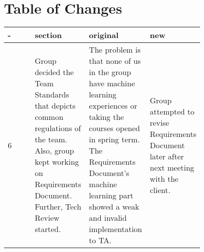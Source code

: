 \documentclass[10pt,journal,compsoc, draftclsnofoot,onecolumn]{IEEEtran}
\begin{document}


\section{Table of Changes}
\begin{center}
 \begin{tabular}{|p{0.2\linewidth}|p{0.2\linewidth}|p{0.2\linewidth}|p{0.2\linewidth}|}
  \hline
 - & section & original & new \\ [0.5ex]
 \hline\hline

6
&
Group decided the Team Standards that depicts common regulations of the team.
Also, group kept working on Requirements Document.
Further, Tech Review started. 
&
The problem is that none of us in the group have machine learning experiences or taking the courses opened in spring term.
The Requirements Document's machine learning part showed a weak and invalid implementation to TA.
&
Group attempted to revise Requirements Document later after next meeting with the client.
\\ \hline

 
 
 \end{tabular}
\end{center}
\end{document}

